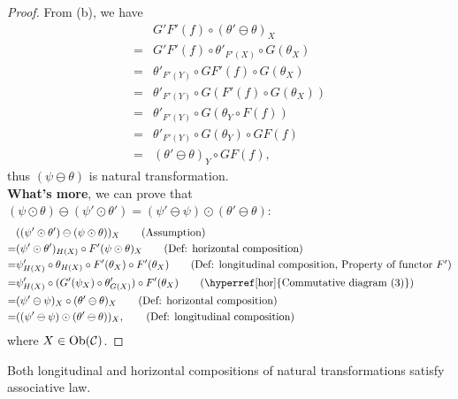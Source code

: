 \documentclass{article}
\begin{document}
\begin{proof}
		From (b), we have
		\begin{align}
			 & G'F'(f)\circ(\theta'\ominus\theta)_X\tag{Assumption}\\
			=& G'F'(f)\circ\theta'_{F'(X)}\circ G(\theta_X)\tag{Def: horizontal composition}\\
			=& \theta'_{F'(Y)}\circ GF'(f)\circ G(\theta_X)\tag{Property of natural transformation $\theta'$}\\
			=& \theta'_{F'(Y)}\circ G(F'(f)\circ G(\theta_X))\tag{Property of functor $G$}\\
			=& \theta'_{F'(Y)}\circ G(\theta_Y\circ F(f))\tag{Property of natural transformation $\theta$}\\
			=& \theta'_{F'(Y)}\circ G(\theta_Y)\circ GF(f)\tag{Property of functor $G$}\\
			=& (\theta'\ominus\theta)_Y\circ GF(f)\tag{Def: horizontal composition},
		\end{align}
		thus $(\psi\ominus\theta)$ is natural transformation.\\
		
		{\bf What's more}, we can prove that $(\psi\odot\theta)\ominus(\psi'\odot\theta')=(\psi'\ominus\psi)\odot(\theta'\ominus\theta)$:
		\begin{align}
			 & ((\psi'\odot\theta')\ominus(\psi\odot\theta))_X\tag{Assumption}\\
			=& (\psi'\odot\theta')_{H(X)}\circ F'(\psi\odot\theta)_X\tag{Def: horizontal composition}\\
			=& \psi'_{H(X)}\circ\theta_{H(X)}\circ F'(\theta_X)\circ F'(\theta_X)\tag{Def: longitudinal composition, Property of functor $F'$}\\
			=& \psi'_{H(X)}\circ(G'(\psi_X)\circ \theta'_{G(X)})\circ F'(\theta_X)\tag{\hyperref[hor]{Commutative diagram (3)}}\\
			=& (\psi'\ominus\psi)_X\circ(\theta'\ominus\theta)_X\tag{Def: horizontal composition}\\
			=& ((\psi'\ominus\psi)\odot(\theta'\ominus\theta))_X,\tag{Def: longitudinal composition}
		\end{align}
		where $X\in\mathrm{Ob}(\mathcal{C})$.
\end{proof}

\begin{thm}
	Both longitudinal and horizontal compositions of natural transformations satisfy associative law.
\end{thm}
\end{document}
